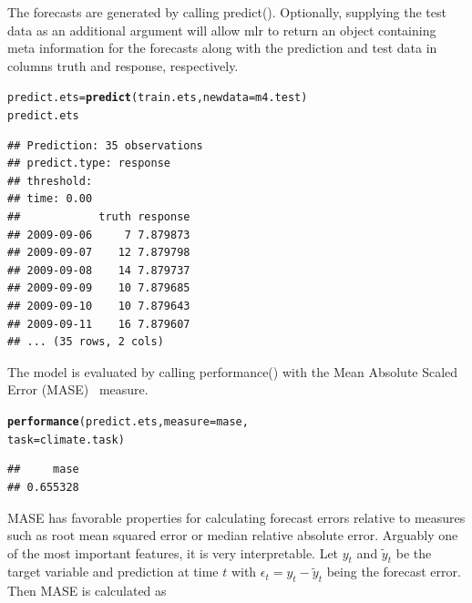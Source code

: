 \documentclass[12pt]{article}\usepackage[]{graphicx}\usepackage[]{color}
\makeatletter
\newcommand{\hlstd}[1]{\textcolor[rgb]{0.345,0.345,0.345}{#1}}%
\newcommand{\hlkwb}[1]{\textcolor[rgb]{0.69,0.353,0.396}{#1}}%
\newcommand{\hlkwc}[1]{\textcolor[rgb]{0.333,0.667,0.333}{#1}}%
\newcommand{\hlkwd}[1]{\textcolor[rgb]{0.737,0.353,0.396}{\textbf{#1}}}%
\newenvironment{kframe}{%
 \def\at@end@of@kframe{}%
 \ifinner\ifhmode%
  \def\at@end@of@kframe{\end{minipage}}%
  \begin{minipage}{\columnwidth}%
 \fi\fi%
 \def\FrameCommand##1{\hskip\@totalleftmargin \hskip-\fboxsep
 \colorbox{shadecolor}{##1}\hskip-\fboxsep
     \hskip-\linewidth \hskip-\@totalleftmargin \hskip\columnwidth}%
 \MakeFramed {\advance\hsize-\width
   \@totalleftmargin\z@ \linewidth\hsize
   \@setminipage}}%
 {\par\unskip\endMakeFramed%
 \at@end@of@kframe}
\newenvironment{knitrout}{}{} %
\theoremstyle{definition}
\newcommand\code{\@codex}
\def\@codex#1{{\normalfont\ttfamily\hyphenchar\font=-1 #1}}
\newcommand{\pkg}[1]{{\fontseries{b}\selectfont #1}}
\makeatother
\begin{document}
The forecasts are generated by calling \code{predict()}. Optionally, supplying the test data as an additional argument will allow \pkg{mlr} to return an object containing meta information for the forecasts along with the prediction and test data in columns \code{truth} and \code{response}, respectively.

\singlespacing
\begin{knitrout}
\color{fgcolor}\begin{kframe}
\begin{alltt}
\hlstd{predict.ets} \hlkwb{=} \hlkwd{predict}\hlstd{(train.ets,} \hlkwc{newdata} \hlstd{= m4.test)}
\hlstd{predict.ets}
\end{alltt}
\begin{verbatim}
## Prediction: 35 observations
## predict.type: response
## threshold: 
## time: 0.00
##            truth response
## 2009-09-06     7 7.879873
## 2009-09-07    12 7.879798
## 2009-09-08    14 7.879737
## 2009-09-09    10 7.879685
## 2009-09-10    10 7.879643
## 2009-09-11    16 7.879607
## ... (35 rows, 2 cols)
\end{verbatim}
\end{kframe}
\end{knitrout}
\doublespacing

The model is evaluated by calling \code{performance()} with the Mean Absolute Scaled Error (MASE)~\cite{Hyndman2006} measure.

\singlespacing
\begin{knitrout}
\color{fgcolor}\begin{kframe}
\begin{alltt}
\hlkwd{performance}\hlstd{(predict.ets,} \hlkwc{measure} \hlstd{= mase,}
            \hlkwc{task} \hlstd{= climate.task)}
\end{alltt}
\begin{verbatim}
##     mase 
## 0.655328
\end{verbatim}
\end{kframe}
\end{knitrout}
\doublespacing
MASE has favorable properties for calculating forecast errors relative to measures such as root mean squared error or median relative absolute error. Arguably one of the most important features, it is very interpretable. Let $y_t$ and $\tilde{y}_t$ be the target variable and prediction at time $t$ with $\epsilon_t = y_t - \tilde{y}_t$ being the forecast error. Then MASE is calculated as
\end{document}
